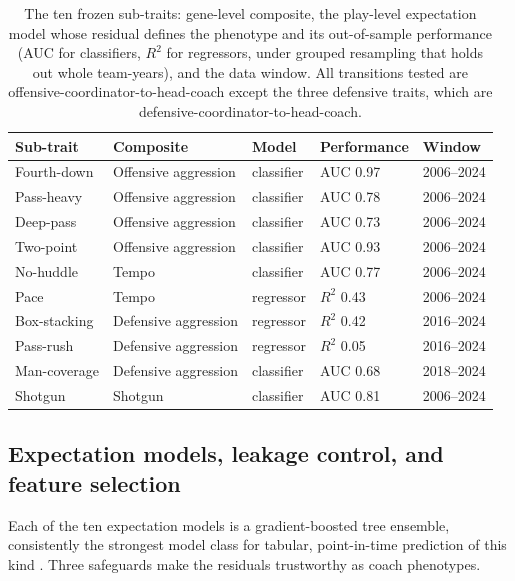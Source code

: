 \documentclass[
  journal=ehs,
  manuscript=article,
  year=2026,
  volume=8,
]{cup-journal}
\begin{document}
\begin{table}[t]
\centering
\caption{The ten frozen sub-traits: gene-level composite, the play-level
expectation model whose residual defines the phenotype and its out-of-sample
performance (AUC for classifiers, $R^2$ for regressors, under grouped resampling
that holds out whole team-years), and the data window. All transitions tested are
offensive-coordinator-to-head-coach except the three defensive traits, which are
defensive-coordinator-to-head-coach.}
\label{tab:traits}
\begin{tabular}{lllll}
\toprule
Sub-trait & Composite & Model & Performance & Window \\
\midrule
Fourth-down  & Offensive aggression & classifier & AUC 0.97 & 2006--2024 \\
Pass-heavy   & Offensive aggression & classifier & AUC 0.78 & 2006--2024 \\
Deep-pass    & Offensive aggression & classifier & AUC 0.73 & 2006--2024 \\
Two-point    & Offensive aggression & classifier & AUC 0.93 & 2006--2024 \\
No-huddle    & Tempo                & classifier & AUC 0.77 & 2006--2024 \\
Pace         & Tempo                & regressor  & $R^2$ 0.43 & 2006--2024 \\
Box-stacking & Defensive aggression & regressor  & $R^2$ 0.42 & 2016--2024 \\
Pass-rush    & Defensive aggression & regressor  & $R^2$ 0.05 & 2016--2024 \\
Man-coverage & Defensive aggression & classifier & AUC 0.68 & 2018--2024 \\
Shotgun      & Shotgun              & classifier & AUC 0.81 & 2006--2024 \\
\bottomrule
\end{tabular}
\end{table}

\subsection{Expectation models, leakage control, and feature selection}
Each of the ten expectation models is a gradient-boosted tree ensemble, consistently
the strongest model class for tabular, point-in-time prediction of this kind
\parencite{chen2016}. Three safeguards make the residuals trustworthy as
coach phenotypes.
\end{document}
